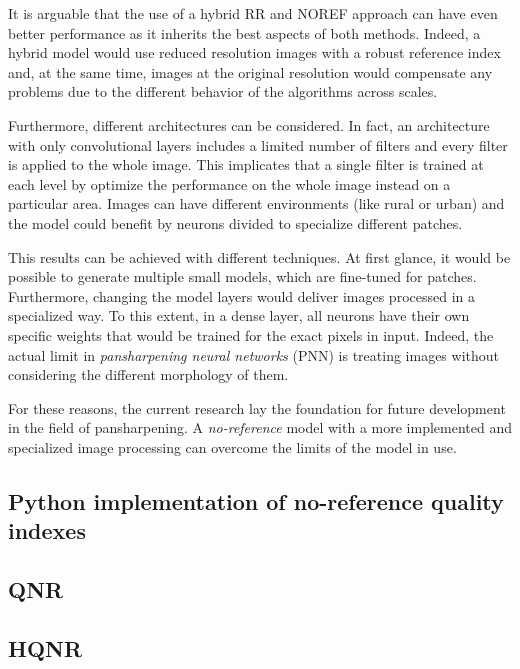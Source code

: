 \documentclass[12pt]{report}
\begin{document}
It is arguable that the use of a hybrid RR and NOREF approach can have even better performance as it inherits the best aspects of both methods.
Indeed, a hybrid model would use reduced resolution images with a robust reference index
and, at the same time, images at the original resolution would compensate any problems due to the different behavior of the algorithms across scales.

Furthermore, different architectures can be considered.
In fact, an architecture with only convolutional layers includes a limited number of filters and every filter is applied to the whole image.
This implicates that a single filter is trained at each level by optimize the performance on the whole image instead on a particular area.
Images can have different environments (like rural or urban) and the model could benefit by neurons divided to specialize different patches.

This results can be achieved with different techniques.
At first glance, it would be possible to generate multiple small models, which are fine-tuned for patches.
Furthermore, changing the model layers would deliver images processed in a specialized way.
To this extent, in a dense layer, all neurons have their own specific weights that would be trained for the exact pixels in input.
Indeed, the actual limit in \textit{pansharpening neural networks} (PNN) is treating images without considering the different morphology of them.

For these reasons, the current research lay the foundation for future development in the field of pansharpening.
A \textit{no-reference} model with a more implemented and specialized image processing can overcome the limits of the model in use.
\newpage




\newpage



\appendix

\begin{spacing}{1}
    \chapter{Python implementation of no-reference quality indexes }
        \section{QNR}
        \label{qnr_functions}
        

        \section{HQNR}
        \label{hqnr_functions}
        
\end{spacing}

\restoregeometry
\end{document}
